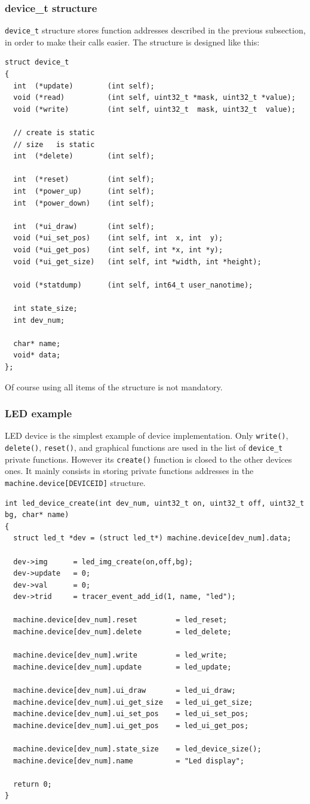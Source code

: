 \documentclass[a4paper,10pt]{report}
\begin{document}
\subsubsection{device\_t structure}
\verb$device_t$ structure stores function addresses described in the previous subsection, in order to make their calls easier. The structure is designed like this:
\begin{verbatim}
struct device_t
{
  int  (*update)        (int self);
  void (*read)          (int self, uint32_t *mask, uint32_t *value);
  void (*write)         (int self, uint32_t  mask, uint32_t  value);

  // create is static
  // size   is static
  int  (*delete)        (int self);

  int  (*reset)         (int self);
  int  (*power_up)      (int self);
  int  (*power_down)    (int self);

  int  (*ui_draw)       (int self);
  void (*ui_set_pos)    (int self, int  x, int  y);
  void (*ui_get_pos)    (int self, int *x, int *y);
  void (*ui_get_size)   (int self, int *width, int *height);

  void (*statdump)      (int self, int64_t user_nanotime);

  int state_size;
  int dev_num;

  char* name;
  void* data;
};
\end{verbatim}
Of course using all items of the structure is not mandatory.

\subsubsection{LED example}
LED device is the simplest example of device implementation. Only \verb$write()$, \verb$delete()$, \verb$reset()$, and graphical functions are used in the list of \verb$device_t$ private functions.
However its \verb$create()$ function is closed to the other devices ones. It mainly consists in storing private functions addresses in the \verb$machine.device[DEVICEID]$ structure.
\begin{verbatim}
int led_device_create(int dev_num, uint32_t on, uint32_t off, uint32_t bg, char* name)
{
  struct led_t *dev = (struct led_t*) machine.device[dev_num].data;
  
  dev->img      = led_img_create(on,off,bg);
  dev->update   = 0;
  dev->val      = 0;
  dev->trid     = tracer_event_add_id(1, name, "led");

  machine.device[dev_num].reset         = led_reset;
  machine.device[dev_num].delete        = led_delete;

  machine.device[dev_num].write         = led_write;
  machine.device[dev_num].update        = led_update;

  machine.device[dev_num].ui_draw       = led_ui_draw;
  machine.device[dev_num].ui_get_size   = led_ui_get_size;
  machine.device[dev_num].ui_set_pos    = led_ui_set_pos;
  machine.device[dev_num].ui_get_pos    = led_ui_get_pos;

  machine.device[dev_num].state_size    = led_device_size();
  machine.device[dev_num].name          = "Led display";

  return 0;
}
\end{verbatim}
\end{document}
